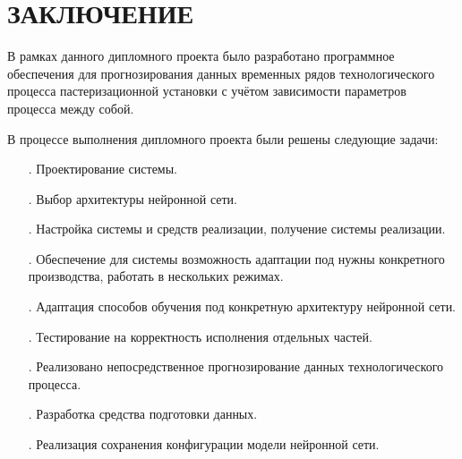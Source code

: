\sectionbreak \section*{
	\gostTitleFont
	\redline
	ЗАКЛЮЧЕНИЕ
}

\subtitlespace

{\gostFont
	\par \redline В рамках данного дипломного проекта было разработано программное обеспечения для прогнозирования данных временных рядов технологического процесса пастеризационной установки с учётом зависимости параметров процесса между собой. 
	
    \par \redline В процессе выполнения дипломного проекта были решены следующие задачи:
	
	\begin{itemize}[leftmargin=2.15cm, labelwidth=0.65cm, labelsep=0.0cm] 
		
		\item[\theitemcntr.] Проектирование системы.		
		\addtocounter{itemcntr}{1}
		
		\item[\theitemcntr.] Выбор архитектуры нейронной сети.		
		\addtocounter{itemcntr}{1}
		
		\item[\theitemcntr.] Настройка системы и средств реализации, получение системы реализации. 		
		\addtocounter{itemcntr}{1}
		
		\item[\theitemcntr.] Обеспечение для системы возможность адаптации под нужны конкретного производства, работать в нескольких режимах.		
		\addtocounter{itemcntr}{1}
		
		\item[\theitemcntr.] Адаптация способов обучения под конкретную архитектуру нейронной сети.		
		\addtocounter{itemcntr}{1}
		
		\item[\theitemcntr.] Тестирование на корректность исполнения отдельных частей.		
		\addtocounter{itemcntr}{1}
		
		\item[\theitemcntr.] Реализовано непосредственное прогнозирование данных технологического процесса.		
		\addtocounter{itemcntr}{1}
		
		\item[\theitemcntr.] Разработка средства подготовки данных.		
		\addtocounter{itemcntr}{1}
		
		\item[\theitemcntr.] Реализация сохранения конфигурации модели нейронной сети.		
		\addtocounter{itemcntr}{1}
		

\end{itemize}}
